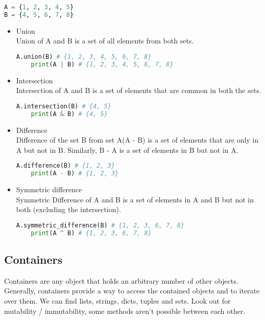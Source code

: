 \documentclass[a4paper, 12pt, titlepage]{scrartcl} %
\begin{document}
\begin{lstlisting}[language=Python]
A = {1, 2, 3, 4, 5}
B = {4, 5, 6, 7, 8}
\end{lstlisting} \vspace{5mm}
\begin{itemize}
    \item Union \\
    Union of A and B is a set of all elements from both sets.
    \begin{lstlisting}[language=Python]
    A.union(B) # {1, 2, 3, 4, 5, 6, 7, 8}
    print(A | B) # {1, 2, 3, 4, 5, 6, 7, 8}\end{lstlisting} \vspace{5mm}
    
    \item Intersection \\
    Intersection of A and B is a set of elements that are common in both the sets.
    \begin{lstlisting}[language=Python]
    A.intersection(B) # {4, 5}
    print(A & B) # {4, 5}\end{lstlisting} \vspace{5mm}
    
    \item Difference \\
    Difference of the set B from set A(A - B) is a set of elements that are only in A but not in B. Similarly, B - A is a set of elements in B but not in A.
    \begin{lstlisting}[language=Python]
    A.difference(B) # {1, 2, 3}
    print(A - B) # {1, 2, 3}\end{lstlisting} \vspace{5mm}
    
    \item Symmetric difference \\
    Symmetric Difference of A and B is a set of elements in A and B but not in both (excluding the intersection).
    \begin{lstlisting}[language=Python]
    A.symmetric_difference(B) # {1, 2, 3, 6, 7, 8}
    print(A ^ B) # {1, 2, 3, 6, 7, 8}\end{lstlisting} \vspace{5mm}
    
\end{itemize}

\subsection{Containers}
Containers are any object that holds an arbitrary number of other objects. Generally, containers provide a way to access the contained objects and to iterate over them. We can find lists, strings, dicts, tuples and sets. Look out for mutability / immutability, some methods aren't possible between each other. \\
\end{document}
